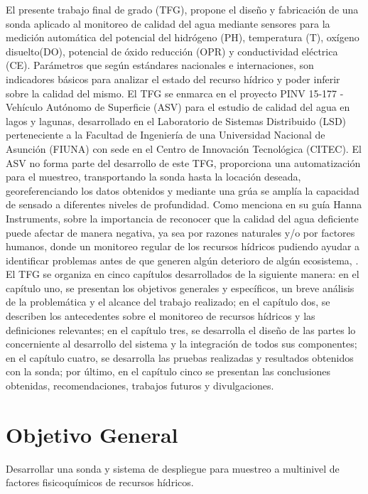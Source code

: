 El presente trabajo final de grado (TFG), propone el diseño y fabricación de una sonda aplicado al monitoreo de calidad del agua mediante sensores para la medición automática del potencial del hidrógeno (PH), temperatura (T), oxígeno disuelto(DO), potencial de \'oxido reducción (OPR) y conductividad eléctrica (CE). 
Par\'ametros que seg\'un estándares nacionales e internaciones, son indicadores básicos para analizar el estado del recurso hídrico y poder inferir sobre la calidad del mismo.
El TFG se enmarca en el proyecto PINV 15-177 - Vehículo Autónomo de Superficie (ASV) para el estudio de calidad del agua en lagos y lagunas, desarrollado en el Laboratorio de Sistemas Distribuido (LSD) perteneciente a la Facultad de Ingeniería de una Universidad Nacional de Asunción (FIUNA) con sede en el Centro de Innovación Tecnológica (CITEC). 
El ASV no forma parte del desarrollo de este TFG, proporciona una automatización para el muestreo, transportando la sonda hasta la locación deseada, georeferenciando los datos obtenidos y mediante una gr\'ua se amplía la capacidad de sensado a diferentes niveles de profundidad. 
Como menciona en su gu\'ia Hanna Instruments, sobre la importancia de reconocer que la calidad del agua deficiente puede afectar de manera negativa,  ya sea por razones naturales y/o por factores humanos, donde un monitoreo regular de los recursos hídricos pudiendo ayudar a identificar problemas antes de que generen algún deterioro de algún ecosistema, \cite{guiaHANNA}.
El TFG  se organiza en cinco capítulos desarrollados de la siguiente manera: 
en el capítulo uno, se presentan los objetivos generales y específicos,  un breve an\'alisis de la problemática y el alcance del trabajo realizado;
en el capítulo dos, se describen los antecedentes sobre el monitoreo de recursos hídricos y las definiciones relevantes;
en el capítulo tres, se desarrolla el diseño de las partes lo concerniente al desarrollo del sistema y la integración de todos sus componentes;   
en el cap\'itulo cuatro, se desarrolla las pruebas realizadas y resultados obtenidos con la sonda;
por último, en el capítulo cinco se presentan las conclusiones obtenidas, recomendaciones, trabajos futuros y divulgaciones.

\section{Objetivo General}
Desarrollar una sonda y sistema de despliegue para muestreo a multinivel de factores fisicoquímicos de recursos hídricos.

